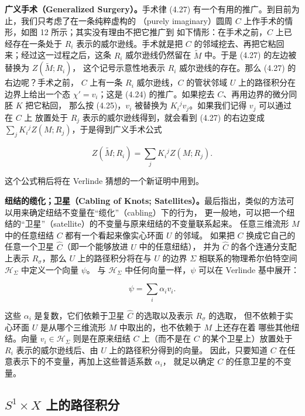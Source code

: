 \documentclass[11pt,a4paper]{article}
\begin{document}
\textbf{广义手术（Generalized Surgery）。}手术律 (4.27) 有一个有用的推广。到目前为止，我们只考虑了在一条纯粹虚构的
（purely imaginary）圆周 $C$ 上作手术的情形，如图 12 所示；其实没有理由不把它推广到
如下情形：在手术之前，$C$ 上已经存在一条处于 $R_i$ 表示的威尔逊线。手术就是把 $C$
的邻域挖去、再把它粘回来；经过这一过程之后，这条 $R_i$ 威尔逊线仍然留在
$\tilde{M}$ 中。于是 (4.27) 的左边被替换为 $Z(\tilde{M};R_i)$，
这个记号示意性地表示 $R_i$ 威尔逊线的存在。那么 (4.27) 的右边呢？手术之前，
$C$ 上有一条 $R_i$ 威尔逊线，$C$ 的管状邻域 $U$ 上的路径积分在边界上给出一个态
$\chi'=v_i$；这是 (4.24) 的推广。如果挖去 $C$、再用边界的微分同胚 $K$ 把它粘回，
那么按 (4.25)，$v_i$ 被替换为 $K_i{}^j v_j$。如果我们记得 $v_j$ 可以通过在 $C$ 上
放置处于 $R_j$ 表示的威尔逊线得到，就会看到 (4.27) 的右边变成
$\sum_j K_i{}^j Z(M;R_j)$，于是得到广义手术公式

\begin{equation}
    Z(\tilde{M};R_i) = \sum_j K_i{}^j Z(M;R_j). \tag{4.28}
\end{equation}

这个公式稍后将在 Verlinde 猜想的一个新证明中用到。

\textbf{纽结的缆化；卫星（Cabling of Knots; Satellites）。}最后指出，类似的方法可以用来确定纽结不变量在“缆化”（cabling）下的行为，
更一般地，可以把一个纽结的“卫星”（satellite）的不变量与原来纽结的不变量联系起来。
任意三维流形 $M$ 中的任意纽结 $C$ 都有一个看起来像实心环面 $U$ 的邻域。
如果把 $C$ 换成它自己的任意一个卫星 $\hat{C}$（即一个能够放进 $U$ 中的任意纽结），
并为 $\hat{C}$ 的各个连通分支配上表示 $R_\sigma$，那么 $U$ 上的路径积分将在与 $U$
的边界 $\Sigma$ 相联系的物理希尔伯特空间 $\mathcal{H}_\Sigma$ 中定义一个向量 $\psi$。
与 $\mathcal{H}_\Sigma$ 中任何向量一样，$\psi$ 可以在 Verlinde 基中展开：

\begin{equation}
    \psi = \sum_i \alpha_i v_i . \tag{4.29}
\end{equation}

这些 $\alpha_i$ 是复数，它们依赖于卫星 $\hat{C}$ 的选取以及表示 $R_\sigma$ 的选取，
但不依赖于实心环面 $U$ 是从哪个三维流形 $M$ 中取出的，也不依赖于 $M$ 上还存在着
哪些其他纽结。向量 $v_i\in\mathcal{H}_\Sigma$ 则是在原来纽结 $C$ 上（而不是在 $C$
的某个卫星上）放置处于 $R_i$ 表示的威尔逊线后、由 $U$ 上的路径积分得到的向量。
因此，只要知道 $C$ 在任意表示下的不变量，再加上这些普适系数 $\alpha_i$，
就足以确定 $C$ 的任意卫星的不变量。

\subsection{\texorpdfstring{$S^1\times X$ 上的路径积分}{S1×X 上的路径积分}}
\end{document}

